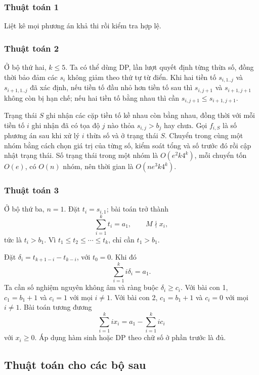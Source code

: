 \documentclass[11pt]{article}
\begin{document}
\subsubsection{Thuật toán 1}

Liệt kê mọi phương án khả thi rồi kiểm tra hợp lệ.

\subsubsection{Thuật toán 2}

Ở bộ thứ hai, \(k\le 5\). Ta có thể dùng DP, lần lượt quyết định từng thừa số,
đồng thời bảo đảm các \(s_i\) không giảm theo thứ tự từ điển. Khi hai tiền tố
\(s_{i,1..j}\) và \(s_{i+1,1..j}\) đã xác định, nếu tiền tố đầu nhỏ hơn tiền tố
sau thì \(s_{i,j+1}\) và \(s_{i+1,j+1}\) không còn bị hạn chế; nếu hai tiền tố
bằng nhau thì cần \(s_{i,j+1}\le s_{i+1,j+1}\).

Trạng thái \(S\) ghi nhận các cặp tiền tố kề nhau còn bằng nhau, đồng thời với
mỗi tiền tố \(i\) ghi nhận đã có tọa độ \(j\) nào thỏa \(s_{i,j}>b_j\) hay
chưa. Gọi \(f_{i,S}\) là số phương án sau khi xử lý \(i\) thừa số và ở trạng
thái \(S\). Chuyển trong cùng một nhóm bằng cách chọn giá trị của từng số,
kiểm soát tổng và số trước đó rồi cập nhật trạng thái. Số trạng thái trong một
nhóm là \(O(e^2k4^k)\), mỗi chuyển tốn \(O(e)\), có \(O(n)\) nhóm, nên thời
gian là \(O(ne^3k4^k)\).

\subsubsection{Thuật toán 3}

Ở bộ thứ ba, \(n=1\). Đặt \(t_i=s_{i,1}\); bài toán trở thành
\[
  \sum_{i=1}^{k}t_i=a_1,\qquad M\nmid x_i,
\]
tức là \(t_i>b_1\). Vì \(t_1\le t_2\le\cdots\le t_k\), chỉ cần \(t_1>b_1\).

Đặt \(\delta_i=t_{k+1-i}-t_{k-i}\), với \(t_0=0\). Khi đó
\[
  \sum_{i=1}^{k} i\delta_i=a_1.
\]
Ta cần số nghiệm nguyên không âm và ràng buộc \(\delta_i\ge c_i\). Với bài con
1, \(c_1=b_1+1\) và \(c_i=1\) với mọi \(i\ne 1\). Với bài con 2,
\(c_1=b_1+1\) và \(c_i=0\) với mọi \(i\ne 1\). Bài toán tương đương
\[
  \sum_{i=1}^{k} i x_i
  =a_1-\sum_{i=1}^{k}ic_i
\]
với \(x_i\ge 0\). Áp dụng hàm sinh hoặc DP theo chữ số ở phần trước là đủ.

\subsection{Thuật toán cho các bộ sau}
\end{document}
